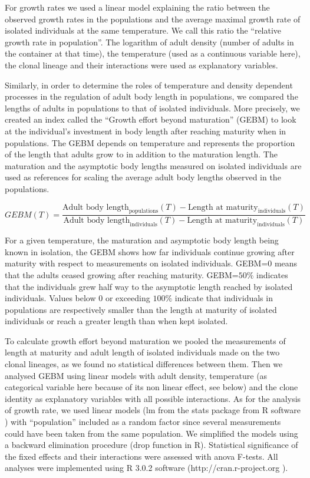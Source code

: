 For growth rates we used a linear model explaining the ratio between the
observed growth rates in the populations and the average maximal growth rate of
isolated individuals at the same temperature. We call this ratio the ``relative
growth rate in population''. The logarithm of adult density (number of adults in
the container at that time), the temperature (used as a continuous variable
here), the clonal lineage and their interactions were used as explanatory
variables.

Similarly, in order to determine the roles of temperature and density dependent
processes in the regulation of adult body length in populations, we compared the
lengths of adults in populations to that of isolated individuals. More
precisely, we created an index called the ``Growth effort beyond maturation''
(GEBM) to look at the individual’s investment in body length after reaching
maturity when in populations. The GEBM depends on temperature and represents the
proportion of the length that adults grow to in addition to the maturation
length. The maturation and the asymptotic body lengths measured on isolated
individuals are used as references for scaling the average adult body lengths
observed in the populations.


\begin{equation}
GEBM(T)=\frac{\text{Adult body length}_{\text{populations}}(T) -
\text{Length at maturity}_{\text{individuals}}(T)}{\text{Adult body
length}_{\text{individuals}}(T) -
\text{Length at maturity}_{\text{individuals}}(T)}
\end{equation}
 
For a given temperature, the maturation and asymptotic body length being known
in isolation, the GEBM shows how far individuals continue growing after maturity
with respect to measurements on isolated individuals. GEBM=0 means that the
adults ceased growing after reaching maturity. GEBM=$50\%$ indicates that the
individuals grew half way to the asymptotic length reached by isolated
individuals. Values below 0 or exceeding $100\%$ indicate that individuals in
populations are respectively smaller than the length at maturity of isolated
individuals or reach a greater length than when kept isolated.

To calculate growth effort beyond maturation we pooled the measurements of
length at maturity and adult length of isolated individuals made on the two
clonal lineages, as we found no statistical differences between them. Then we
analysed GEBM using linear models with adult density, temperature (as
categorical variable here because of its non linear effect, see below) and the
clone identity as explanatory variables with all possible interactions. As for
the analysis of growth rate, we used linear models (lm from the stats package
from R software \autocites{pinheiro2000a}) with ``population'' included as a
random factor since several measurements could have been taken from the same population. We
simplified the models using a backward elimination procedure (drop function in
R). Statistical significance of the fixed effects and their interactions were
assessed with anova F-tests. All analyses were implemented using R 3.0.2
software (http://cran.r-project.org \autocites{ihaka1996a}).


